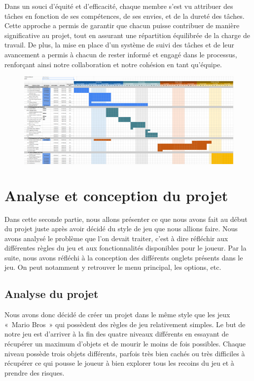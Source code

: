 \documentclass[12pt,a4paper]{article}
\begin{document}
            Dans un souci d'équité et d'efficacité, chaque membre s'est vu attribuer des tâches en fonction de ses compétences, de ses envies, et de la dureté des tâches. Cette approche a permis de garantir que chacun puisse contribuer de manière significative au projet, tout en assurant une répartition équilibrée de la charge de travail. De plus, la mise en place d'un système de suivi des tâches et de leur avancement a permis à chacun de rester informé et engagé dans le processus, renforçant ainsi notre collaboration et notre cohésion en tant qu'équipe.\\

            \begin{figure}[h]
                \centering
                \includegraphics[width=13cm]{images/diagramme_GANTT.png}\\
            \end{figure}

    \newpage
    
    \section{Analyse et conception du projet}
        \tabto{1cm} Dans cette seconde partie, nous allons présenter ce que nous avons fait au début du projet juste après avoir décidé du style de jeu que nous allions faire. Nous avons analysé le problème que l'on devait traiter, c'est à dire réfléchir aux différentes règles du jeu et aux fonctionnalités disponibles pour le joueur. Par la suite, nous avons réfléchi à la conception des différents onglets présents dans le jeu. On peut notamment y retrouver le menu principal, les options, etc.

        \subsection{Analyse du projet}
            \tabto{1cm} Nous avons donc décidé de créer un projet dans le même style que les jeux «~Mario Bros~» qui possèdent des règles de jeu relativement simples. Le but de notre jeu est d’arriver à la fin des quatre niveaux différents en essayant de récupérer un maximum d’objets et de mourir le moins de fois possibles. Chaque niveau possède trois objets différents, parfois très bien cachés ou très difficiles à récupérer ce qui pousse le joueur à bien explorer tous les recoins du jeu et à prendre des risques.\\
\end{document}
